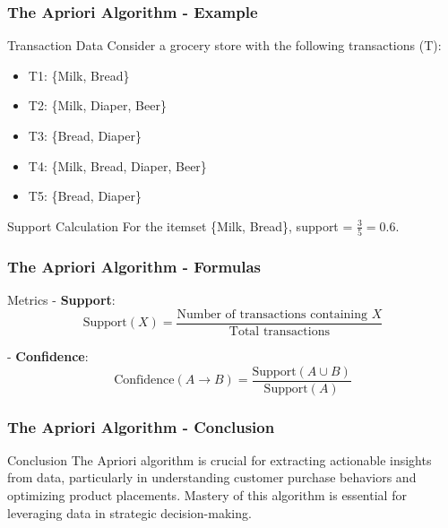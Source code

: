 \documentclass[aspectratio=169]{beamer}
\begin{document}
\begin{frame}[fragile]
    \frametitle{The Apriori Algorithm - Example}
    \begin{block}{Transaction Data}
        Consider a grocery store with the following transactions (T):
        \begin{itemize}
            \item T1: \{Milk, Bread\}
            \item T2: \{Milk, Diaper, Beer\}
            \item T3: \{Bread, Diaper\}
            \item T4: \{Milk, Bread, Diaper, Beer\}
            \item T5: \{Bread, Diaper\}
        \end{itemize}
    \end{block}

    \begin{block}{Support Calculation}
        For the itemset \{Milk, Bread\}, support = \(\frac{3}{5} = 0.6\).
    \end{block}
\end{frame}

\begin{frame}[fragile]
    \frametitle{The Apriori Algorithm - Formulas}
    \begin{block}{Metrics}
        - \textbf{Support}:
        \begin{equation}
            \text{Support}(X) = \frac{\text{Number of transactions containing } X}{\text{Total transactions}} 
        \end{equation}

        - \textbf{Confidence}:
        \begin{equation}
            \text{Confidence}(A \to B) = \frac{\text{Support}(A \cup B)}{\text{Support}(A)} 
        \end{equation}
    \end{block}
\end{frame}

\begin{frame}[fragile]
    \frametitle{The Apriori Algorithm - Conclusion}
    \begin{block}{Conclusion}
        The Apriori algorithm is crucial for extracting actionable insights from data, particularly in understanding customer purchase behaviors and optimizing product placements. Mastery of this algorithm is essential for leveraging data in strategic decision-making.
    \end{block}
\end{frame}
\end{document}
